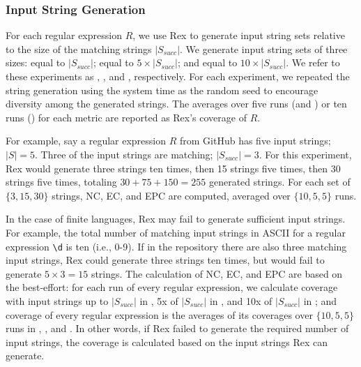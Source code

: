 \subsubsection{Input String Generation}
For each regular expression $R$, we use Rex to generate input string sets relative to the size of the matching strings $\lvert S_{succ} \rvert$. 
We generate input string sets of three sizes: equal to $\lvert S_{succ} \rvert$; equal to $5 \times \lvert S_{succ} \rvert$; and equal to $10 \times \lvert S_{succ} \rvert$. We refer to these experiments as \RexSOne, \RexSFive, and \RexSTen, respectively. For each experiment, we repeated the string generation using the system time as the random seed to encourage diversity among the generated strings. The averages over five runs (\RexSFive and \RexSTen) or ten runs (\RexSOne) for each metric are reported as Rex's coverage of $R$. 

For example, say a regular expression $R$ from GitHub has five input strings; $\lvert S \rvert = 5$. Three of the input strings are matching; $\lvert S_{succ} \rvert = 3$. For this experiment, Rex would generate three strings ten times, then 15 strings five times, then 30 strings five times, totaling $30 + 75 + 150 = 255$ generated strings. For each set of $\{3, 15, 30\}$ strings, NC, EC, and EPC are computed, averaged over $\{10,5,5\}$ runs. %

In the case of finite languages, Rex may fail to generate sufficient input strings. For example, the total number of matching input strings in ASCII for a regular expression \verb!\d! is ten (i.e., 0-9). If in the repository there are also three matching input strings, Rex could generate three strings ten times, but would fail to generate $5 \times 3 = 15$ strings. %
The calculation of NC, EC, and EPC are based on the best-effort: for each run of every regular expression, we calculate coverage with input strings up to $\lvert S_{succ} \rvert$ in \RexSOne, 5x of $\lvert S_{succ} \rvert$ in \RexSFive, and 10x of $\lvert S_{succ} \rvert$ in \RexSTen; and coverage of every regular expression is the averages of its coverages over $\{10,5,5\}$ runs in \RexSOne, \RexSFive, and \RexSTen. In other words, if Rex failed to generate the required number of input strings, the coverage is calculated based on the input strings Rex can generate.

